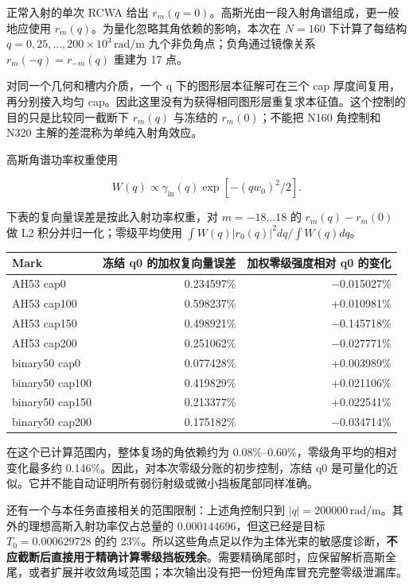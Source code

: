 \documentclass[
  chinese,
  UTF8,
  a4paper,
  11pt]{ctexart}
\newcounter{none} %
\begin{document}
正常入射的单次 RCWA 给出
\(r_m(q=0)\)。高斯光由一段入射角谱组成，更一般地应使用
\(r_m(q)\)。为量化忽略其角依赖的影响，本次在 \(N=160\) 下计算了每结构
\(q=0,25,\ldots,200\times10^3\,\mathrm{rad/m}\)
九个非负角点；负角通过镜像关系 \(r_m(-q)=r_{-m}(q)\) 重建为 17 点。

对同一个几何和槽内介质，一个 q 下的图形层本征解可在三个 cap
厚度间复用，再分别接入均匀
cap。因此这里没有为获得相同图形层重复求本征值。这个控制的目的只是比较同一截断下
\(r_m(q)\) 与冻结的 \(r_m(0)\)；不能把 N160 角控制和 N320
主解的差混称为单纯入射角效应。

高斯角谱功率权重使用

\[
W(q)\propto\gamma_{\mathrm{in}}(q)
\exp[-(qw_0)^2/2].
\]

下表的复向量误差是按此入射功率权重，对 \(m=-18\ldots18\) 的
\(r_m(q)-r_m(0)\) 做 L2 积分并归一化；零级平均使用
\(\int W(q)|r_0(q)|^2dq/\int W(q)dq\)。

{\def\LTcaptype{none} %
\begin{longtable}[]{@{}lrr@{}}
\toprule\noalign{}
Mark & 冻结 q0 的加权复向量误差 & 加权零级强度相对 q0 的变化 \\
\midrule\noalign{}
\endhead
\bottomrule\noalign{}
\endlastfoot
AH53 cap0 & 0.234597\% & −0.015027\% \\
AH53 cap100 & 0.598237\% & +0.010981\% \\
AH53 cap150 & 0.498921\% & −0.145718\% \\
AH53 cap200 & 0.251062\% & −0.027771\% \\
binary50 cap0 & 0.077428\% & +0.003989\% \\
binary50 cap100 & 0.419829\% & +0.021106\% \\
binary50 cap150 & 0.213377\% & +0.022541\% \\
binary50 cap200 & 0.175182\% & −0.034714\% \\
\end{longtable}
}

在这个已计算范围内，整体复场的角依赖约为
0.08\%--0.60\%，零级角平均的相对变化最多约
0.146\%。因此，对本次零级分账的初步控制，冻结 q0
是可量化的近似。它并不能自动证明所有弱衍射级或微小挡板尾部同样准确。

还有一个与本任务直接相关的范围限制：上述角控制只到
\(|q|=200000\,\mathrm{rad/m}\)。其外的理想高斯入射功率仅占总量的
\(0.000144696\)，但这已经是目标 \(T_0=0.000629728\) 的约
23\%。所以这些角点足以作为主体光束的敏感度诊断，\textbf{不应截断后直接用于精确计算零级挡板残余}。需要精确尾部时，应保留解析高斯全尾，或者扩展并收敛角域范围；本次输出没有把一份短角库冒充完整零级泄漏库。
\end{document}
